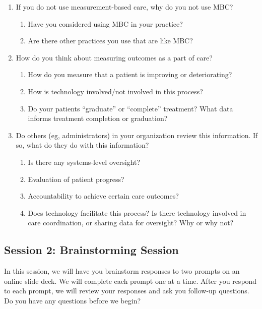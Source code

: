 \begin{enumerate}
\begin{enumerate}
    \end{enumerate}
    \item If you do not use measurement-based care, why do you not use MBC?
    \begin{enumerate}
        \item Have you considered using MBC in your practice?
        \item Are there other practices you use that are like MBC?
    \end{enumerate}
    \item How do you think about measuring outcomes as a part of care? 
    \begin{enumerate}
        \item How do you measure that a patient is improving or deteriorating?
        \item How is technology involved/not involved in this process?
        \item Do your patients ``graduate'' or ``complete'' treatment? What data informs treatment completion or graduation?
    \end{enumerate}
    \item Do others (eg, administrators) in your organization review this information. If so, what do they do with this information?
    \begin{enumerate}
        \item Is there any systems-level oversight?
        \item Evaluation of patient progress?
        \item Accountability to achieve certain care outcomes?
        \item Does technology facilitate this process? Is there technology involved in care coordination, or sharing data for oversight? Why or why not?
    \end{enumerate}

\end{enumerate}

\subsection{Session 2: Brainstorming Session}

 In this session, we will have you brainstorm responses to two prompts on an online slide deck. We will complete each prompt one at a time. After you respond to each prompt, we will review your responses and ask you follow-up questions. Do you have any questions before we begin?

